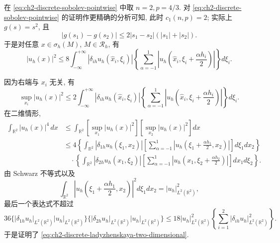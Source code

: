 \begin{Proof}
在 \eqref{eq:ch2-discrete-sobolev-pointwise} 中取 $n=2,p=4/3$. 对 \eqref{eq:ch2-discrete-sobolev-pointwise} 的证明作更精确的分析可知, 此时 $c_1(n,p)=2$; 实际上 $g(s)=s^2$, 且
\[
|g(s_1)-g(s_2)|\leq2|s_1-s_2|(|s_1|+|s_2|).
\]
于是对任意 $x\in\sigma_h(M)$, $M\in\mathcal R_h$, 有
\begin{equation}
|u_h(x)|^2
\leq8\int_{-\infty}^{+\infty}|\delta_{ih}u_h(\widehat x_i,\xi_i)|
\left\{\sum_{\alpha=-1}^{1}
\left|u_h\left(\widehat x_i,\xi_i+\frac{\alpha h_i}{2}\right)\right|\right\}d\xi_i.
\label{eq:ch2-discrete-ladyzhenskaya-pointwise}
\end{equation}

\hypertarget{chapter-02-page-140}{}
因为右端与 $x_i$ 无关, 有
\begin{equation}
\sup_{x_i}|u_h(x)|^2
\leq2\int_{-\infty}^{+\infty}|\delta_{ih}u_h(\widehat x_i,\xi_i)|
\left\{\sum_{\alpha=-1}^{1}
\left|u_h\left(\widehat x_i,\xi_i+\frac{\alpha h_i}{2}\right)\right|\right\}d\xi_i.
\label{eq:ch2-discrete-ladyzhenskaya-supremum}
\end{equation}
在二维情形,
\begin{equation}
\begin{aligned}
\int_{\mathbb R^2}|u_h(x)|^4\,dx
&\leq\int_{\mathbb R^2}
\left[\sup_{x_1}|u_h(x)|^2\right]
\left[\sup_{x_2}|u_h(x)|^2\right]dx\\
&\leq4\left\{\int_{\mathbb R^2}|\delta_{1h}u_h(\xi_1,x_2)|
\left[\sum_{\alpha=-1}^{1}\left|u_h\left(\xi_1+\frac{\alpha h_1}{2},x_2\right)\right|\right]d\xi_1dx_2\right\}\\
&\quad\cdot\left\{\int_{\mathbb R^2}|\delta_{2h}u_h(x_1,\xi_2)|
\left[\sum_{\alpha=-1}^{1}\left|u_h\left(x_1,\xi_2+\frac{\alpha h_2}{2}\right)\right|\right]dx_1d\xi_2\right\}.
\end{aligned}
\label{eq:ch2-discrete-ladyzhenskaya-two-dimensional-proof}
\end{equation}
由 Schwarz 不等式以及
\begin{equation}
\int_{\mathbb R^2}\left|u_h\left(\xi_1+\frac{\alpha h_1}{2},x_2\right)\right|^2d\xi_1dx_2
=|u_h|_{L^2(\mathbb R^2)}^2,
\label{eq:ch2-translation-invariant-l2}
\end{equation}
最后一个表达式不超过
\[
36\{|\delta_{1h}u_h|_{L^2(\mathbb R^2)}|u_h|_{L^2(\mathbb R^2)}\}
\{|\delta_{2h}u_h|_{L^2(\mathbb R^2)}|u_h|_{L^2(\mathbb R^2)}\}
\leq18|u_h|_{L^2(\mathbb R^2)}^2
\left\{\sum_{i=1}^{2}|\delta_{ih}u_h|_{L^2(\mathbb R^2)}^2\right\}.
\]
于是证明了 \eqref{eq:ch2-discrete-ladyzhenskaya-two-dimensional}.


\end{Proof}
